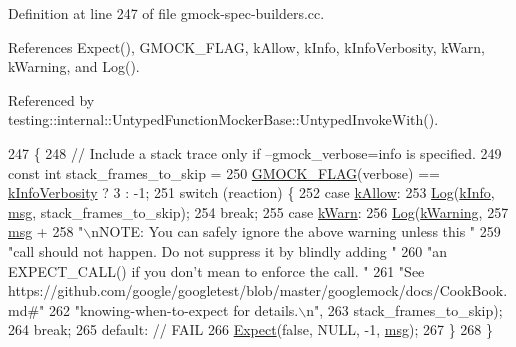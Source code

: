 Definition at line 247 of file gmock-\/spec-\/builders.\+cc.



References Expect(), G\+M\+O\+C\+K\+\_\+\+F\+L\+AG, k\+Allow, k\+Info, k\+Info\+Verbosity, k\+Warn, k\+Warning, and Log().



Referenced by testing\+::internal\+::\+Untyped\+Function\+Mocker\+Base\+::\+Untyped\+Invoke\+With().


\begin{DoxyCode}
247                                                                        \{
248   \textcolor{comment}{// Include a stack trace only if --gmock\_verbose=info is specified.}
249   \textcolor{keyword}{const} \textcolor{keywordtype}{int} stack\_frames\_to\_skip =
250       \hyperlink{gmock-port_8h_ad7119adfef06be5e7b1551633f5a1436}{GMOCK\_FLAG}(verbose) == \hyperlink{namespacetesting_1_1internal_a96274a788ffc75a6dffdfa8aa1f34fb9}{kInfoVerbosity} ? 3 : -1;
251   \textcolor{keywordflow}{switch} (reaction) \{
252     \textcolor{keywordflow}{case} \hyperlink{namespacetesting_1_1internal_adfcd859062983a889f4bd18e6977357ea8fb8a836a31364701cd5c07daa8638cb}{kAllow}:
253       \hyperlink{namespacetesting_1_1internal_ac0bc151763a8187d74387c4b2ba685c9}{Log}(\hyperlink{namespacetesting_1_1internal_a203d1a8a2147a53d12bbdae40d443914a396aacfaee2849eaab7c1de9773d624d}{kInfo}, \hyperlink{namespacebattery__monitor__node_ab1920c64448816edd4064e494275fdff}{msg}, stack\_frames\_to\_skip);
254       \textcolor{keywordflow}{break};
255     \textcolor{keywordflow}{case} \hyperlink{namespacetesting_1_1internal_adfcd859062983a889f4bd18e6977357ead61a9c681c751967e19f7abe4640d4a2}{kWarn}:
256       \hyperlink{namespacetesting_1_1internal_ac0bc151763a8187d74387c4b2ba685c9}{Log}(\hyperlink{namespacetesting_1_1internal_a203d1a8a2147a53d12bbdae40d443914a5beeeab1b0a3caabd0afb43356c1a271}{kWarning},
257           \hyperlink{namespacebattery__monitor__node_ab1920c64448816edd4064e494275fdff}{msg} +
258           \textcolor{stringliteral}{"\(\backslash\)nNOTE: You can safely ignore the above warning unless this "}
259           \textcolor{stringliteral}{"call should not happen.  Do not suppress it by blindly adding "}
260           \textcolor{stringliteral}{"an EXPECT\_CALL() if you don't mean to enforce the call.  "}
261           \textcolor{stringliteral}{"See https://github.com/google/googletest/blob/master/googlemock/docs/CookBook.md#"}
262           \textcolor{stringliteral}{"knowing-when-to-expect for details.\(\backslash\)n"},
263           stack\_frames\_to\_skip);
264       \textcolor{keywordflow}{break};
265     \textcolor{keywordflow}{default}:  \textcolor{comment}{// FAIL}
266       \hyperlink{namespacetesting_1_1internal_ab3000fc56be000e4fa6ed7cdcfee3106}{Expect}(\textcolor{keyword}{false}, NULL, -1, \hyperlink{namespacebattery__monitor__node_ab1920c64448816edd4064e494275fdff}{msg});
267   \}
268 \}
\end{DoxyCode}
